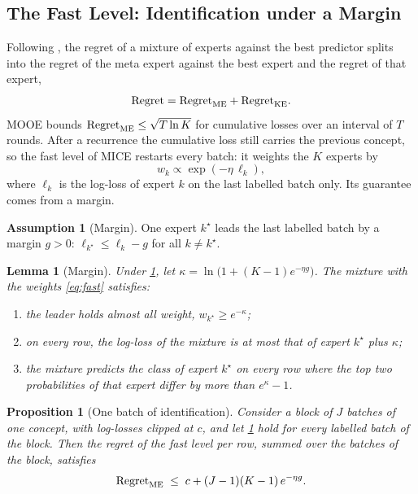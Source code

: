 \documentclass[11pt]{article}
\theoremstyle{plain}
\newtheorem{proposition}{Proposition}
\newtheorem{lemma}{Lemma}
\theoremstyle{definition}
\newtheorem{assumption}{Assumption}
\theoremstyle{remark}
\newcommand{\method}{\textsc{MICE}}   %
\begin{document}
\subsection{The Fast Level: Identification under a Margin}
\label{sec:th-fast}

Following \citet{zhao2025mooe}, the regret of a mixture of experts against the best predictor splits into the regret
of the meta expert against the best expert and the regret of that expert,
\begin{equation}\label{eq:decomp}
  \mathrm{Regret}=\mathrm{Regret}_{\mathrm{ME}}+\mathrm{Regret}_{\mathrm{KE}} .
\end{equation}
MOOE bounds $\mathrm{Regret}_{\mathrm{ME}}\le\sqrt{T\ln K}$ for cumulative losses over an interval of $T$ rounds. After a
recurrence the cumulative loss still carries the previous concept, so the fast level of \method{} restarts every
batch: it weights the $K$ experts by
\begin{equation}\label{eq:fast}
  w_k\propto\exp(-\eta\,\ell_k),
\end{equation}
where $\ell_k$ is the log-loss of expert $k$ on the last labelled batch only. Its guarantee comes from a margin.

\begin{assumption}[Margin]\label{ass:margin}
One expert $k^\star$ leads the last labelled batch by a margin $g>0$: $\ell_{k^\star}\le\ell_k-g$ for all
$k\ne k^\star$.
\end{assumption}

\begin{lemma}[Margin]\label{lem:margin}
Under \cref{ass:margin}, let $\kappa=\ln\bigl(1+(K-1)e^{-\eta g}\bigr)$. The mixture with the weights
\eqref{eq:fast} satisfies:
\begin{enumerate}
  \item[(i)] the leader holds almost all weight, $w_{k^\star}\ge e^{-\kappa}$;
  \item[(ii)] on every row, the log-loss of the mixture is at most that of expert $k^\star$ plus $\kappa$;
  \item[(iii)] the mixture predicts the class of expert $k^\star$ on every row where the top two probabilities of
  that expert differ by more than $e^{\kappa}-1$.
\end{enumerate}
\end{lemma}

\begin{proposition}[One batch of identification]\label{prop:block}
Consider a block of $J$ batches of one concept, with log-losses clipped at $c$, and let \cref{ass:margin} hold for
every labelled batch of the block. Then the regret of the fast level per row, summed over the batches of the block,
satisfies
\[
  \mathrm{Regret}_{\mathrm{ME}}\;\le\;c+(J-1)(K-1)\,e^{-\eta g} .
\]
\end{proposition}
\end{document}
